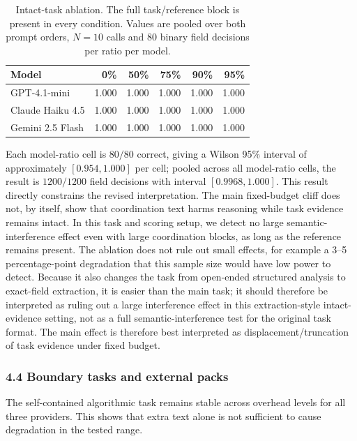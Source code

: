 \documentclass[
  runningheads]{llncs}
\begin{document}
\begin{table}[t]
\centering
\small
\caption{Intact-task ablation. The full task/reference block is present in every condition. Values are pooled over both prompt orders, $N=10$ calls and $80$ binary field decisions per ratio per model.}
\begin{tabular}{lrrrrr}
\toprule
Model & 0\% & 50\% & 75\% & 90\% & 95\% \\
\midrule
GPT-4.1-mini & 1.000 & 1.000 & 1.000 & 1.000 & 1.000 \\
Claude Haiku 4.5 & 1.000 & 1.000 & 1.000 & 1.000 & 1.000 \\
Gemini 2.5 Flash & 1.000 & 1.000 & 1.000 & 1.000 & 1.000 \\
\bottomrule
\end{tabular}
\end{table}

Each model-ratio cell is \(80/80\) correct, giving a Wilson 95\%
interval of approximately \([0.954,1.000]\) per cell; pooled across all
model-ratio cells, the result is \(1200/1200\) field decisions with
interval \([0.9968,1.000]\). This result directly constrains the revised
interpretation. The main fixed-budget cliff does not, by itself, show
that coordination text harms reasoning while task evidence remains
intact. In this task and scoring setup, we detect no large
semantic-interference effect even with large coordination blocks, as
long as the reference remains present. The ablation does not rule out
small effects, for example a 3--5 percentage-point degradation that this
sample size would have low power to detect. Because it also changes the
task from open-ended structured analysis to exact-field extraction, it
is easier than the main task; it should therefore be interpreted as
ruling out a large interference effect in this extraction-style
intact-evidence setting, not as a full semantic-interference test for
the original task format. The main effect is therefore best interpreted
as displacement/truncation of task evidence under fixed budget.

\subsubsection{4.4 Boundary tasks and external
packs}\label{boundary-tasks-and-external-packs}

The self-contained algorithmic task remains stable across overhead
levels for all three providers. This shows that extra text alone is not
sufficient to cause degradation in the tested range.
\end{document}
